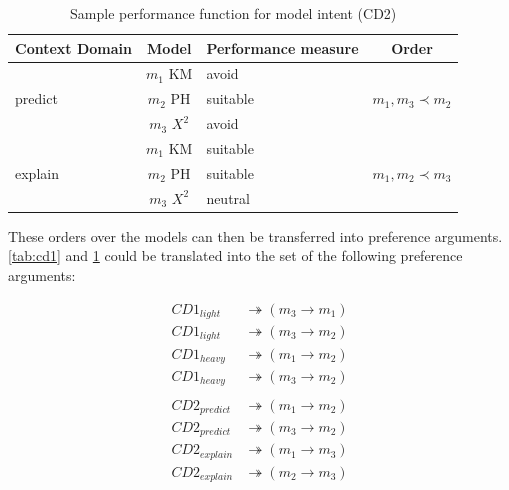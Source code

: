 \begin{table}[b]
	\centering
	\begin{tabular}{|l|c|l|c|}
	\hline
	Context Domain 			& Model 			& Performance measure & Order\\
	\hline\hline
	\multirow{3}{*}{predict}& $m_1$ KM 		& avoid		& \multirow{3}{*}{$m_1, m_3 \prec m_2$}\\
							& $m_2$ PH		& suitable	&\\
							& $m_3$ $X^2$	& avoid		&\\
	\hline
	\multirow{3}{*}{explain}& $m_1$ KM 		& suitable	& \multirow{3}{*}{$m_1, m_2 \prec m_3$}\\
							& $m_2$ PH		& suitable	&\\
							& $m_3$ $X^2$	& neutral	&\\
	\hline
	\end{tabular}
	\caption{Sample performance function for model intent (CD2) \cite{sassoon2016CD}}
	\label{tab:cd2}
\end{table}
These orders over the models can then be transferred into preference arguments. \autoref{tab:cd1} and \ref{tab:cd2} could be translated into the set of the following preference arguments:

\begin{align*}
CD1_{light} &\twoheadrightarrow (m_3 \rightarrow m_1)\\
CD1_{light} &\twoheadrightarrow (m_3 \rightarrow m_2)\\
CD1_{heavy} &\twoheadrightarrow (m_1 \rightarrow m_2)\\
CD1_{heavy} &\twoheadrightarrow (m_3 \rightarrow m_2)\\
\\
CD2_{predict} &\twoheadrightarrow (m_1 \rightarrow m_2)\\
CD2_{predict} &\twoheadrightarrow (m_3 \rightarrow m_2)\\
CD2_{explain} &\twoheadrightarrow (m_1 \rightarrow m_3)\\
CD2_{explain} &\twoheadrightarrow (m_2 \rightarrow m_3)\\
\end{align*}


